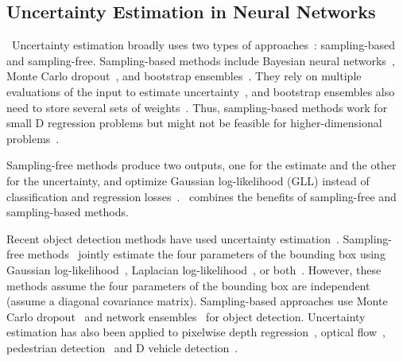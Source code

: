 \documentclass[10pt,twocolumn,letterpaper]{article}
\newcommand{\1}{{\bf 1}}
\newcommand{\0}{{\bf 0}}
\begin{document}
    
\subsection{Uncertainty Estimation in Neural Networks} 
    \vspace{-0.2cm}\
    Uncertainty estimation broadly uses two types of approaches~\cite{le2018uncertainty}: sampling-based and sampling-free. Sampling-based methods include Bayesian neural networks~\cite{shridhar2019comprehensive}, Monte Carlo dropout~\cite{gal2016dropout}, and bootstrap ensembles~\cite{lakshminarayanan2017simple}. They rely on multiple evaluations of the input to estimate uncertainty~\cite{le2018uncertainty}, and bootstrap ensembles also need to store several sets of weights~\cite{ilg2018uncertainty}. Thus, sampling-based methods work for small D regression problems but might not be feasible for higher-dimensional problems~\cite{ilg2018uncertainty}. 

    Sampling-free methods produce two outputs, one for the estimate and the other for the uncertainty, and optimize Gaussian log-likelihood (GLL) instead of classification and regression losses~\cite{kendall2017uncertainties, lakshminarayanan2017simple,le2018uncertainty}.~\cite{lakshminarayanan2017simple} combines the benefits of sampling-free and sampling-based methods. 
    
    Recent object detection methods have used uncertainty estimation~\cite{le2018uncertainty, jiang2018acquisition, levi2019evaluating, he2019bounding, miller2019benchmarking, harakeh2019bayesod,atoum2017monocular}. Sampling-free methods~\cite{le2018uncertainty, levi2019evaluating, he2019bounding} jointly estimate the four parameters of the bounding box using Gaussian log-likelihood~\cite{levi2019evaluating}, Laplacian log-likelihood~\cite{le2018uncertainty}, or both~\cite{he2019bounding}. However, these methods assume the four parameters of the bounding box are independent (assume a diagonal covariance matrix). Sampling-based approaches use Monte Carlo dropout~\cite{miller2019benchmarking} and network ensembles~\cite{lakshminarayanan2017simple} for object detection.
    Uncertainty estimation has also been applied to pixelwise depth regression~\cite{kendall2017uncertainties}, optical flow~\cite{ilg2018uncertainty}, pedestrian detection~\cite{neumann2018relaxed,bhattacharyya2018long,bertoni2019monoloco} and D vehicle detection~\cite{feng2018towards}.
    
\end{document}
